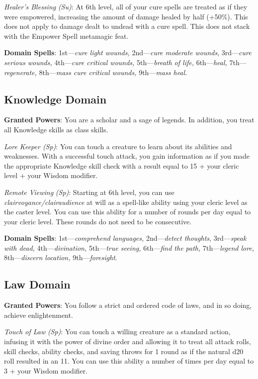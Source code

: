 \textit{Healer's Blessing} \textit{(Su)}: At 6th level, all of your cure spells are treated as if they were
empowered, increasing the amount of damage healed by half (+50\%). This does not apply to damage dealt to 
undead with a cure spell. This does not stack with the Empower Spell metamagic feat.

\textbf{Domain Spells}: 1st---\textit{cure light wounds, }2nd---\textit{cure moderate wounds}, 3rd---\textit{cure serious wounds, }4th---\textit{cure critical wounds, }5th---\textit{breath of life, }6th---\textit{heal, }7th---\textit{regenerate, }8th---\textit{mass cure critical wounds, }9th---\textit{mass heal}.
				
\subsection{Knowledge Domain}


\textbf{Granted Powers}: You are a scholar and a sage of legends. In addition, you treat all Knowledge skills as
class skills.

\textit{Lore Keeper (Sp)}: You can touch a creature to learn about its abilities and weaknesses. With a successful
touch attack, you gain information as if you made the appropriate Knowledge skill check with a result equal to
15 + your cleric level + your Wisdom modifier.

\textit{Remote Viewing} \textit{(Sp)}: Starting at 6th level, you can use \textit{clairvoyance/clairaudience} at
will as a spell-like ability using your cleric level as the caster level. You can use this ability for a number of
rounds per day equal to your cleric level. These rounds do not need to be consecutive.
				
\textbf{Domain Spells}: 1st---\textit{comprehend languages, }2nd---\textit{detect thoughts}, 3rd---\textit{speak with dead, }4th---\textit{divination, }5th---\textit{true seeing, }6th---\textit{find the path, }7th---\textit{legend lore, }8th---\textit{discern location, }9th---\textit{foresight}.
				
\subsection{Law Domain}

				
\textbf{Granted Powers}: You follow a strict and ordered code of laws, and in so doing, achieve enlightenment.
				
\textit{Touch of Law} \textit{(Sp)}: You can touch a willing creature as a standard action, infusing it with the
power of divine order and allowing it to treat all attack rolls, skill checks, ability checks, and saving throws
for 1 round as if the natural d20 roll resulted in an 11. You can use this ability a number of times per day equal
to 3 + your Wisdom modifier. 


